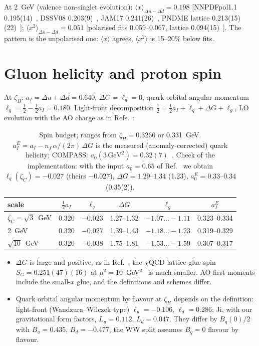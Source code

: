 \documentclass[11pt,a4paper]{article}
\newcommand{\zH}{\zeta_H}
\newcommand{\mom}[1]{\langle #1\rangle}
\begin{document}
At 2~GeV (valence non-singlet evolution):
$\mom{x}_{\Delta u-\Delta d} = 0.198$ [NNPDFpol1.1 0.195(14)~\cite{Nocera:2014gqa}, DSSV08
0.203(9)~\cite{deFlorian:2009vb}, JAM17 0.241(26)~\cite{Ethier:2017zbq}, PNDME lattice
0.213(15)(22)~\cite{Mondal:2020cmt}];
$\mom{x^2}_{\Delta u-\Delta d} = 0.051$ [polarised fits 0.059--0.067, lattice 0.094(15)~\cite{Taggi:2026}]. The pattern is
the unpolarised one: $\mom{x}$ agrees, $\mom{x^2}$ is 15--20\% below fits.

\section{Gluon helicity and proton spin}
At $\zH$: $a_I = \Delta u + \Delta d = 0.640$, $\Delta G = \ell_g = 0$, quark orbital angular momentum
$\ell_q = \tfrac12 - \tfrac12 a_I = 0.180$. Light-front decomposition
$\tfrac12 = \tfrac12 a_I + \ell_q + \Delta G + \ell_g$, LO evolution with the AO charge as in
Refs.~\cite{EPJC84:739,Cheng:2023kmt}:
\begin{table}[H]
\centering\small
\begin{tabular}{lccccc}
\toprule
scale & $\tfrac12 a_I$ & $\ell_q$ & $\Delta G$ & $\ell_g$ & $a_I^E$\\
\midrule
$\zeta_C = \sqrt3$~GeV & 0.320 & $-0.023$ & 1.27--1.32 & $-1.07\ldots-1.11$ & 0.323--0.334\\
2~GeV & 0.320 & $-0.027$ & 1.39--1.43 & $-1.18\ldots-1.23$ & 0.319--0.329\\
$\sqrt{10}$~GeV & 0.320 & $-0.038$ & 1.75--1.81 & $-1.53\ldots-1.59$ & 0.307--0.317\\
\bottomrule
\end{tabular}
\caption{Spin budget; ranges from $\zH = 0.3266$ or 0.331~GeV. $a_I^E = a_I - n_f\,\alpha/(2\pi)\,\Delta G$ is the
measured (anomaly-corrected) quark helicity; COMPASS: $a_0(3\,\text{GeV}^2) = 0.32(7)$~\cite{Adolph:2016myg}.
Check of the implementation: with the input $a_0 = 0.65$ of Ref.~\cite{Cheng:2023kmt} we obtain
$\ell_q(\zeta_C) = -0.027$ (theirs $-0.027$), $\Delta G = 1.29$--$1.34$ (1.23), $a_0^E = 0.33$--$0.34$ (0.35(2)).}
\end{table}

\begin{itemize}
\item $\Delta G$ is large and positive, as in Ref.~\cite{Cheng:2023kmt}; the $\chi$QCD lattice glue spin
  $S_G = 0.251(47)(16)$ at $\mu^2 = 10$~GeV$^2$~\cite{Yang:2016plb} is much smaller. AO first moments include the small-$x$
  glue, and the definitions and schemes differ.
\item Quark orbital angular momentum by flavour at $\zH$ depends on the definition: light-front (Wandzura--Wilczek type)
  $\ell_u = -0.106$, $\ell_d = 0.286$; Ji, with our gravitational form factors, $L_u = 0.112$, $L_d = 0.047$. They differ by
  $B_q(0)/2$ with $B_u = 0.435$, $B_d = -0.477$; the WW split assumes $B_q = 0$ flavour by flavour.
\end{itemize}
\end{document}
